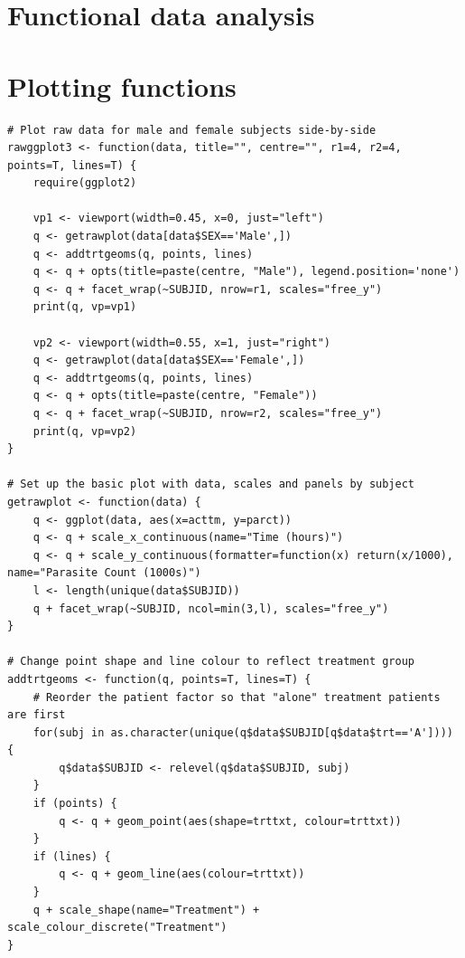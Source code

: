 \clearpage
\section{Functional data analysis}

\clearpage
\section{Plotting functions}
\samepage
\begin{lstlisting}[float=h,caption=Plot raw count data for male and female subjects side-by-side,label=R:rawggplot]
# Plot raw data for male and female subjects side-by-side
rawggplot3 <- function(data, title="", centre="", r1=4, r2=4, points=T, lines=T) {
	require(ggplot2)

	vp1 <- viewport(width=0.45, x=0, just="left")
	q <- getrawplot(data[data$SEX=='Male',])
	q <- addtrtgeoms(q, points, lines)
	q <- q + opts(title=paste(centre, "Male"), legend.position='none')
	q <- q + facet_wrap(~SUBJID, nrow=r1, scales="free_y")
	print(q, vp=vp1)

	vp2 <- viewport(width=0.55, x=1, just="right")
	q <- getrawplot(data[data$SEX=='Female',])
	q <- addtrtgeoms(q, points, lines)
	q <- q + opts(title=paste(centre, "Female"))
	q <- q + facet_wrap(~SUBJID, nrow=r2, scales="free_y")
	print(q, vp=vp2)
}

# Set up the basic plot with data, scales and panels by subject
getrawplot <- function(data) {
	q <- ggplot(data, aes(x=acttm, y=parct))
	q <- q + scale_x_continuous(name="Time (hours)")
	q <- q + scale_y_continuous(formatter=function(x) return(x/1000), name="Parasite Count (1000s)")
	l <- length(unique(data$SUBJID))
	q + facet_wrap(~SUBJID, ncol=min(3,l), scales="free_y")
}

# Change point shape and line colour to reflect treatment group
addtrtgeoms <- function(q, points=T, lines=T) {
	# Reorder the patient factor so that "alone" treatment patients are first
	for(subj in as.character(unique(q$data$SUBJID[q$data$trt=='A']))) {
		q$data$SUBJID <- relevel(q$data$SUBJID, subj)
	}
	if (points) {
		q <- q + geom_point(aes(shape=trttxt, colour=trttxt))
	}
	if (lines) {
		q <- q + geom_line(aes(colour=trttxt))
	}
	q + scale_shape(name="Treatment") + scale_colour_discrete("Treatment")
}
\end{lstlisting}

